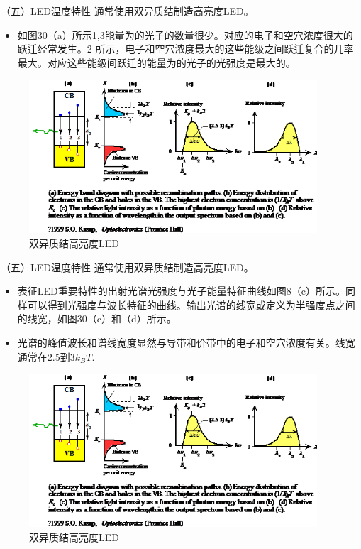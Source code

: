 \documentclass[trans]{beamer} %
\begin{document}
 \begin{frame}{（五）LED温度特性}
  通常使用双异质结制造高亮度LED。
    \begin{itemize}
        \item 如图30（a）所示1,3能量为的光子的数量很少。对应的电子和空穴浓度很大的跃迁经常发生。2 所示，电子和空穴浓度最大的这些能级之间跃迁复合的几率最大。对应这些能级间跃迁的能量为的光子的光强度是最大的。

    \end{itemize}
    
    \begin{figure}[htbp] 
    \centering\includegraphics[height=2.25in]{source/ch2/fg231.png} 
    \caption{双异质结高亮度LED}
    \end{figure}
 \end{frame} 
 
 \begin{frame}{（五）LED温度特性}
  通常使用双异质结制造高亮度LED。
    \begin{itemize}
        \item 表征LED重要特性的出射光谱光强度与光子能量特征曲线如图8（c）所示。同样可以得到光强度与波长特征的曲线。输出光谱的线宽或定义为半强度点之间的线宽，如图30（c）和（d）所示。
        \item 光谱的峰值波长和谱线宽度显然与导带和价带中的电子和空穴浓度有关。线宽通常在2.5到3$k_BT$.

    \end{itemize}
    
    \begin{figure}[htbp] 
    \centering\includegraphics[height=2.25in]{source/ch2/fg231.png} 
    \caption{双异质结高亮度LED}
    \end{figure}
 \end{frame} 
\end{document}
